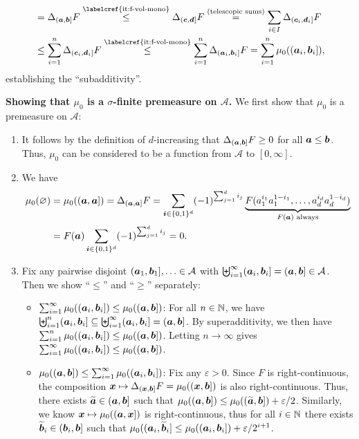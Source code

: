 \begin{enumerate}
\begin{pf}
\begin{itemize}
\begin{align*}
&=\Delta_{(\vect{a},\vect{b}]}F
\overset{\text{\labelcref{it:f-vol-mono}}}{\le}\Delta_{(\vect{c},\vect{d}]}F
\overset{\text{(telescopic sums)}}{=}\sum_{i\in I}^{}\Delta_{(\vect{c}_i,\vect{d}_i]}F \\
&\le\sum_{i=1}^{n}\Delta_{(\vect{c}_i,\vect{d}_i]}F
\overset{\text{\labelcref{it:f-vol-mono}}}{\le}\sum_{i=1}^{n}\Delta_{(\vect{a}_i,\vect{b}_i]}F
=\sum_{i=1}^{n}\mu_0((\vect{a}_i,\vect{b}_i]),
\end{align*}
establishing the ``subadditivity''.
\end{itemize}
\textbf{Showing that \(\mu_0\) is a \(\sigma\)-finite premeasure on
\(\mathcal{A}\).}
We first show that \(\mu_0\) is a premeasure on \(\mathcal{A}\):
\begin{enumerate}[label={(\arabic*)}]
\item It follows by the definition of \(d\)-increasing that
\(\Delta_{(\bm{a},\bm{b}]}F\ge 0\) for all \(\bm{a}\le\bm{b}\).
Thus, \(\mu_0\) can be considered to be a function from \(\mathcal{A}\) to \([0,\infty]\).
\item We have
\begin{align*}
\mu_0(\varnothing)&=\mu_0((\bm{a},\bm{a}])
=\Delta_{(\bm{a},\bm{a}]}F=\sum_{\bm{i}\in\{0,1\}^{d}}^{}(-1)^{\sum_{j=1}^{d}i_j}
\underbrace{F(a_1^{i_1}a_1^{1-i_1},\dotsc,a_d^{i_d}a_d^{1-i_d})}_{\text{\(F(\bm{a})\) always}} \\
&=F(\bm{a})\sum_{\bm{i}\in\{0,1\}^{d}}^{}(-1)^{\sum_{j=1}^{d}i_j}=0.
\end{align*}
\item Fix any pairwise disjoint \((\bm{a}_1,\bm{b}_1]
,\dotsc\in\mathcal{A}\) with
\(\biguplus_{i=1}^{\infty}(\bm{a}_i,\bm{b}_i]=
(\bm{a},\bm{b}]\in\mathcal{A}\). Then we show ``\(\leq\)'' and ``\(\geq\)''
separately:
\begin{itemize}
\item \underline{\(\sum_{i=1}^{\infty}\mu_0((\bm{a}_i,\bm{b}_i])\le\mu_0((\bm{a},\bm{b}])\)}:
For all \(n\in\mathbb{N}\), we have
\(\biguplus_{i=1}^{n}(\bm{a}_i,\bm{b}_i]\subseteq
\biguplus_{i=1}^{\infty}(\bm{a}_i,\bm{b}_i]=(\bm{a},\bm{b}]\). By
superadditivity, we then have
\(\sum_{i=1}^{n}\mu_0((\bm{a}_i,\bm{b}_i])\le\mu_0((\bm{a},\bm{b}])\).
Letting \(n\to\infty\) gives
\(\sum_{i=1}^{\infty}\mu_0((\bm{a}_i,\bm{b}_i])\le\mu_0((\bm{a},\bm{b}])\).

\item \underline{\(\mu_0((\bm{a},\bm{b}])\le\sum_{i=1}^{\infty}\mu_0((\bm{a}_i,\bm{b}_i])\)}:
Fix any \(\varepsilon>0\). Since \(F\) is right-continuous, the composition
\(\bm{x}\mapsto \Delta_{(\bm{x},\bm{b}]}F=\mu_0((\bm{x},\bm{b}])\) is
also right-continuous. Thus, there exists
\(\widetilde{\bm{a}}\in(\bm{a},\bm{b}]\) such that
\(\mu_0((\bm{a},\bm{b}])\le\mu_0((\widetilde{\bm{a}},\bm{b}])+\varepsilon/2\).
Similarly, we know \(\bm{x}\mapsto\mu_0((\bm{a},\bm{x}])\) is
right-continuous, thus for all \(i\in\mathbb{N}\) there exists
\(\widetilde{\bm{b}}_i\in(\bm{b}_i,\bm{b}]\) such that
\(\mu_0((\bm{a}_i,\widetilde{\bm{b}}_i]
\le\mu_0((\bm{a}_i,\bm{b}_i])+\varepsilon/2^{i+1}\).


\end{itemize}
\end{enumerate}
\end{pf}
\end{enumerate}

